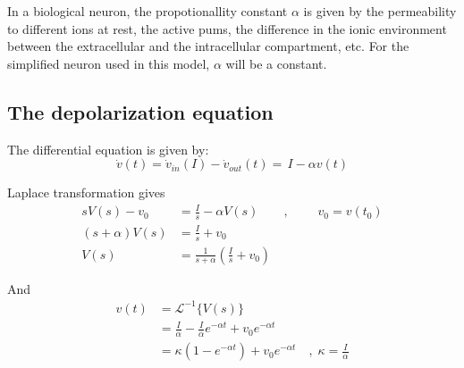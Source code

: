 In a biological neuron, the propotionallity constant $\alpha$ is given by 
	the permeability to different ions at rest, 
	the active pums, 
	the difference in the ionic environment between the extracellular and the intracellular compartment, 
	etc.
For the simplified neuron used in this model, $\alpha$ will be a constant. %


\subsection{The depolarization equation}%
The differential equation is given by:
\begin{equation}
	\dot{v}(t) = \dot{v}_{in}(I) - \dot{v}_{out}(t) = \, I - \alpha v(t)
\end{equation}

Laplace transformation gives
\begin{equation}
	\begin{split}
		sV(s)-v_0 		&= \frac{I}{s} - \alpha V(s) 			\qquad, \; \qquad v_0 = v(t_0) 				\\
		(s+\alpha)V(s) 	&= \frac{I}{s} + v_0 														\\
		V(s) 			&= \frac{1}{s+\alpha}\left( \frac{I}{s} + v_0 \right)
	\end{split}
\end{equation}

And 
\begin{equation}
	\begin{split}
		v(t)  	&= 		\mathscr{L}^{-1}\bigg\{ V(s) \bigg\}  									\\
		 		&=		\frac{I}{\alpha} - \frac{I}{\alpha} e^{-\alpha t} + v_0 e^{-\alpha t} 	\\
				&= 		\kappa \left( 1 - e^{-\alpha t} \right) + v_0 e^{-\alpha t} 	\quad,\; \kappa = \frac{I}{\alpha} 
		\label{eqVerdiligninga}
	\end{split}
\end{equation}

